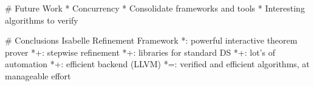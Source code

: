 \documentclass[fleqn]{beamer}
\begin{document}
# Future Work
  * Concurrency
  * Consolidate frameworks and tools
  * Interesting algorithms to verify

# Conclusions
  Isabelle Refinement Framework
    *{}: powerful interactive theorem prover
    *+: stepwise refinement
    *+: libraries for standard DS
    *+: lot's of automation
    *+: efficient backend (LLVM)
    *=: verified and efficient algorithms, at manageable effort


%
%
%
%
%
%
%
%
\end{document}
